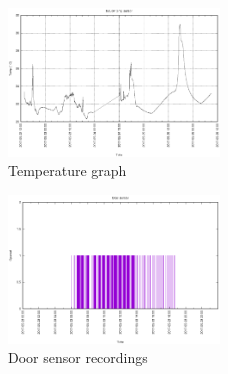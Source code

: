 \documentclass{below-ext}
\begin{document}
\begin{figure}
\centering
\label{fig:temp}
\includegraphics[width=0.5\textwidth]{graph}
\caption{Temperature graph}
\end{figure}
\begin{figure}
\centering
\label{fig:doorsensor}
\includegraphics[width=0.5\textwidth]{doorsensor}
\caption{Door sensor recordings}
\end{figure}

\end{document}
